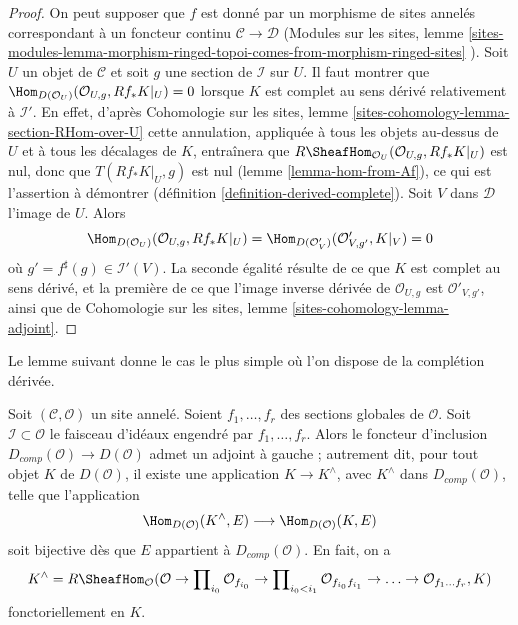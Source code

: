 \begin{proof}
On peut supposer que $f$ est donné par un morphisme de sites annelés correspondant
à un foncteur continu $\mathcal{C} \to \mathcal{D}$
(Modules sur les sites, lemme
\ref{sites-modules-lemma-morphism-ringed-topoi-comes-from-morphism-ringed-sites}
).
Soit $U$ un objet de $\mathcal{C}$ et soit $g$ une section de
$\mathcal{I}$ sur $U$. Il faut montrer que
$\Hom_{D(\mathcal{O}_U)}(\mathcal{O}_{U, g}, Rf_*K|_U) = 0$
lorsque $K$ est complet au sens dérivé relativement à $\mathcal{I}'$.
En effet, d'après Cohomologie sur les sites, lemme
\ref{sites-cohomology-lemma-section-RHom-over-U}
cette annulation, appliquée à tous les objets au-dessus de $U$ et à tous les décalages de $K$,
entraînera que $R\SheafHom_{\mathcal{O}_U}(\mathcal{O}_{U, g}, Rf_*K|_U)$
est nul, donc que $T(Rf_*K|_U, g)$ est nul
(lemme \ref{lemma-hom-from-Af}), ce qui est l'assertion à démontrer
(définition \ref{definition-derived-complete}).
Soit $V$ dans $\mathcal{D}$ l'image de $U$. Alors
$$
\Hom_{D(\mathcal{O}_U)}(\mathcal{O}_{U, g}, Rf_*K|_U) =
\Hom_{D(\mathcal{O}'_V)}(\mathcal{O}'_{V, g'}, K|_V) = 0
$$
où $g' = f^\sharp(g) \in \mathcal{I}'(V)$. La seconde égalité
résulte de ce que $K$ est complet au sens dérivé, et la première de ce que
l'image inverse dérivée de $\mathcal{O}_{U, g}$ est $\mathcal{O}'_{V, g'}$,
ainsi que de
Cohomologie sur les sites, lemme \ref{sites-cohomology-lemma-adjoint}.
\end{proof}

\noindent
Le lemme suivant donne le cas le plus simple où l'on dispose de la complétion dérivée.

\begin{lemma}
\label{lemma-derived-completion}
Soit $(\mathcal{C}, \mathcal{O})$ un site annelé. Soient $f_1, \ldots, f_r$
des sections globales de $\mathcal{O}$. Soit $\mathcal{I} \subset \mathcal{O}$
le faisceau d'idéaux engendré par $f_1, \ldots, f_r$.
Alors le foncteur d'inclusion $D_{comp}(\mathcal{O}) \to D(\mathcal{O})$
admet un adjoint à gauche ; autrement dit, pour tout objet $K$ de $D(\mathcal{O})$,
il existe une application $K \to K^\wedge$, avec $K^\wedge$ dans $D_{comp}(\mathcal{O})$,
telle que l'application
$$
\Hom_{D(\mathcal{O})}(K^\wedge, E) \longrightarrow \Hom_{D(\mathcal{O})}(K, E)
$$
soit bijective dès que $E$ appartient à $D_{comp}(\mathcal{O})$. En fait,
on a
$$
K^\wedge =
R\SheafHom_\mathcal{O}
(\mathcal{O} \to \prod\nolimits_{i_0} \mathcal{O}_{f_{i_0}} \to
\prod\nolimits_{i_0 < i_1} \mathcal{O}_{f_{i_0}f_{i_1}} \to
\ldots \to \mathcal{O}_{f_1\ldots f_r}, K)
$$
fonctoriellement en $K$.
\end{lemma}

